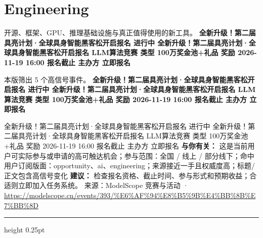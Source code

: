 \documentclass[10.5pt]{ctexart}
\begin{document}
\section*{Engineering}
{\color{ormuted} 开源、框架、GPU、推理基础设施与真正值得使用的新工具。}
\vspace{2mm}
{\LARGE\bfseries 全新升级！第二届具亮计划·全球具身智能黑客松开启报名 进行中 全新升级！第二届具亮计划·全球具身智能黑客松开启报名 LLM算法竞赛 类型 100万奖金池+礼品 奖励 2026-11-19 16:00 报名截止 主办方 立即报名}\par
\vspace{1mm}
{\color{ormuted} 本版筛出 5 个高信号事件。}
\vspace{3mm}
{\Large\bfseries 全新升级！第二届具亮计划·全球具身智能黑客松开启报名 进行中 全新升级！第二届具亮计划·全球具身智能黑客松开启报名 LLM算法竞赛 类型 100万奖金池+礼品 奖励 2026-11-19 16:00 报名截止 主办方 立即报名}\par
全新升级！第二届具亮计划·全球具身智能黑客松开启报名 进行中 全新升级！第二届具亮计划·全球具身智能黑客松开启报名 LLM算法竞赛 类型 100万奖金池+礼品 奖励 2026-11-19 16:00 报名截止 主办方 立即报名
\textbf{与你有关：} 这是当前用户可实际参与或申请的高可触达机会；参与范围：全国 / 线上 / 部分线下；命中用户订阅版面：opportunity、ai、engineering；来源接近一手且权威度高；标题/正文包含高信号变化
\textbf{建议：} 检查报名资格、截止时间、参与形式和预期收益；合适则立即加入任务系统。
{\footnotesize\color{ormuted} 来源：ModelScope 竞赛与活动 · \url{https://modelscope.cn/events/393/%E6%AF%94%E8%B5%9B%E4%BB%8B%E7%BB%8D}}
\vspace{4mm}
\hrule height 0.25pt
\vspace{3mm}
\end{document}
